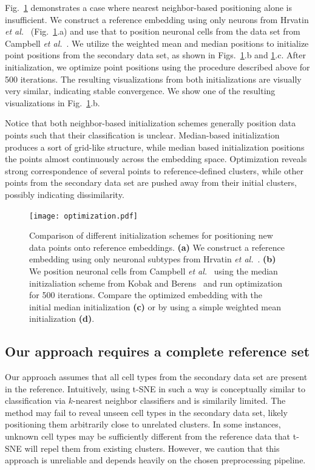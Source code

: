 \documentclass[runningheads]{llncs}
\newcommand{\etal}{\textit{et al.}}
\begin{document}
Fig.~\ref{fig:optimization} demonstrates a case where nearest neighbor-based 
positioning alone is insufficient. We construct a reference embedding using only
neurons from Hrvatin \etal~\cite{Hrvatin2018} (Fig.~\ref{fig:optimization}.a)
and use that to position neuronal
cells from the data set from Campbell \etal~\cite{Campbell2017}. We utilize the
weighted mean and median positions to initialize point positions from the secondary
data set, as shown in Figs.~\ref{fig:optimization}.b and \ref{fig:optimization}.c.
After initialization, we optimize point positions using the procedure described
above for 500 iterations. The resulting visualizations from both initializations
are visually very similar, indicating stable convergence. We show one of the resulting
visualizations in Fig.~\ref{fig:optimization}.b.

Notice that both neighbor-based initialization schemes generally position data points
such that their classification is unclear. Median-based initialization produces
a sort of grid-like structure, while median based initialization positions the points
almost continuously across the embedding space. Optimization reveals strong
correspondence of several points to reference-defined clusters, while other points
from the secondary data set are pushed away from their initial clusters, possibly
indicating dissimilarity.


\begin{figure}[htbp]
  \texttt{[image: optimization.pdf]}
  \caption{Comparison of different initialization schemes for positioning new data
  points onto reference embeddings. {\bf (a)} We construct a reference embedding
  using only neuronal subtypes from Hrvatin \etal~\cite{Hrvatin2018}. {\bf (b)}
  We position neuronal cells from Campbell \etal~\cite{Campbell2017} using the
  median initizaliation scheme from Kobak and Berens~\cite{Kobak2019} and
  run optimization for 500 iterations. Compare the optimized embedding with the 
  initial median initialization {\bf (c)} or by using a simple weighted mean
  initialization {\bf (d)}.}
  \label{fig:optimization}
\end{figure}

\subsection{Our approach requires a complete reference set}

Our approach assumes that all cell types from the secondary data set are present
in the reference. Intuitively, using t-SNE in such a way is conceptually similar
to classification via $k$-nearest neighbor classifiers and is similarily
limited. The method may fail to reveal unseen cell types in the secondary data
set, likely positioning them arbitrarily close to unrelated clusters. In some
instances, unknown cell types may be sufficiently different from the reference
data that t-SNE will repel them from existing clusters. However, we caution that
this approach is unreliable and depends heavily on the chosen preprocessing
pipeline.
\end{document}
